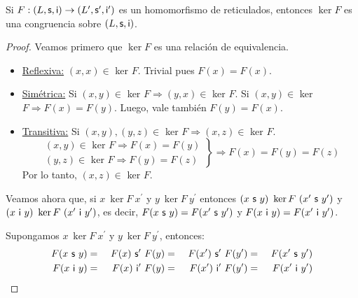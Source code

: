   \begin{lemma} \label{lemma_10}
    \PN Si $F: (L, \mathsf{s}, \mathsf{i}) \rightarrow (L^{\prime}, \mathsf{s}^{\prime}, \mathsf{i}^{\prime})$ es un homomorfismo de reticulados, entonces $\ker F$ es una congruencia sobre
    $(L, \mathsf{s}, \mathsf{i})$.
  \end{lemma}
  \begin{proof}
    \PN Veamos primero que $\ker F$ es una relación de equivalencia.
    \begin{itemize}
      \item \underline{Reflexiva:} $(x, x) \in$ ker $F$. Trivial pues $F(x) = F(x)$.
      \item \underline{Simétrica:} Si $(x, y) \in$ ker $F \Rightarrow (y, x) \in$ ker $F$.
        \PN Si $(x, y) \in$ ker $F \Rightarrow F(x) = F(y)$. Luego, vale también $F(y) = F(x)$.
      \item \underline{Transitiva:} Si $(x, y), (y, z) \in$ ker $F \Rightarrow (x, z) \in$ ker $F$.
        \begin{equation*}
          \left.
          \begin{array}{l}
            (x, y) \in \text{ ker } F \Rightarrow F(x) = F(y) \\
            (y, z) \in \text{ ker } F \Rightarrow F(y) = F(z)
          \end{array}
          \right \rbrace \Rightarrow F(x) = F(y) = F(z)
        \end{equation*}
        \PN Por lo tanto, $(x, z) \in$ ker $F$.
      \end{itemize}

    \PN Veamos ahora que, si $x \ \ker F \ x^{\prime}$ y $y \ \ker F \ y^{\prime}$ entonces $(x \ \mathsf{s} \ y) \ \ker F \
    (x^{\prime} \ \mathsf{s} \ y^{\prime})$ y $(x \ \IN \ y) \ \ker F \ (x^{\prime} \ \IN \ y^{\prime})$, es decir, $F(x \ \mathsf{s}
    \ y) = F(x^{\prime} \ \mathsf{s} \ y^{\prime})$ y $F(x \ \IN \ y) = F(x^{\prime} \ \IN \ y^{\prime})$.

    \vspace{3mm}
    \PN Supongamos $x \ \ker F \ x^{\prime}$ y $y \ \ker F \ y^{\prime}$, entonces:
    \begin{alignat*}{4}
      F(x \ \mathsf{s} \ y) &=& \ F(x) \ \mathsf{s^{\prime}} \ F(y) &=& \ F(x^{\prime}) \ \mathsf{s^{\prime}} \ F(y^{\prime})
        &=& \ F(x^{\prime} \ \mathsf{s} \ y^{\prime}) \\
      F(x \ \mathsf{i} \ y) &=& \ F(x) \ \mathsf{i^{\prime}} \ F(y) &=& \ F(x^{\prime}) \ \mathsf{i^{\prime}} \ F(y^{\prime})
        &=& \ F(x^{\prime} \ \mathsf{i} \ y^{\prime})
    \end{alignat*}
  \end{proof}

